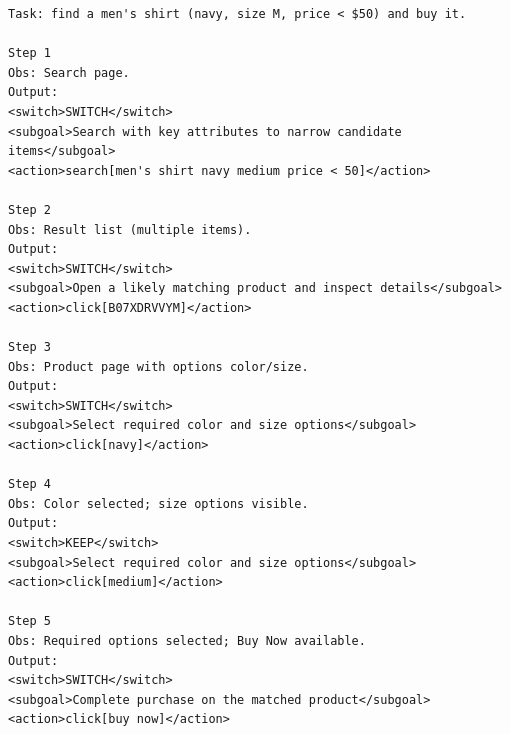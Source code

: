 \documentclass{article}
\begin{document}
\begin{lstlisting}
Task: find a men's shirt (navy, size M, price < $50) and buy it.

Step 1
Obs: Search page.
Output:
<switch>SWITCH</switch>
<subgoal>Search with key attributes to narrow candidate items</subgoal>
<action>search[men's shirt navy medium price < 50]</action>

Step 2
Obs: Result list (multiple items).
Output:
<switch>SWITCH</switch>
<subgoal>Open a likely matching product and inspect details</subgoal>
<action>click[B07XDRVVYM]</action>

Step 3
Obs: Product page with options color/size.
Output:
<switch>SWITCH</switch>
<subgoal>Select required color and size options</subgoal>
<action>click[navy]</action>

Step 4
Obs: Color selected; size options visible.
Output:
<switch>KEEP</switch>
<subgoal>Select required color and size options</subgoal>
<action>click[medium]</action>

Step 5
Obs: Required options selected; Buy Now available.
Output:
<switch>SWITCH</switch>
<subgoal>Complete purchase on the matched product</subgoal>
<action>click[buy now]</action>
\end{lstlisting}




\newpage

\end{document}
